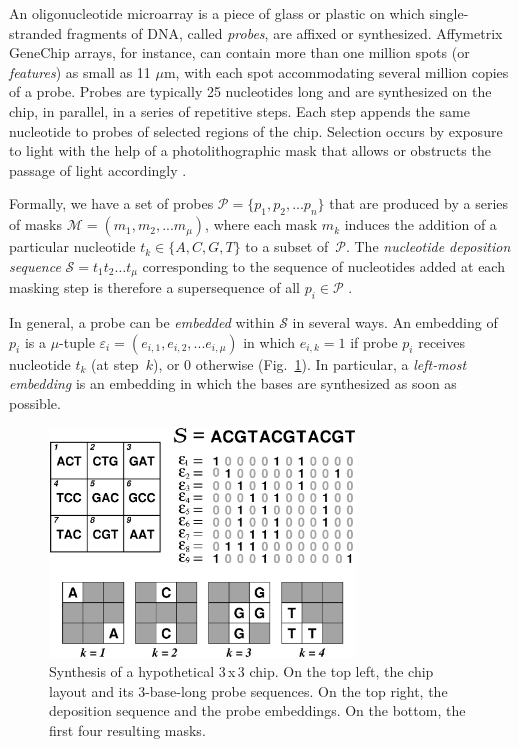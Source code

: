 \documentclass[runningheads]{llncs}
\begin{document}
An oligonucleotide microarray is a piece of glass or plastic on which
single-stranded fragments of DNA, called \emph{probes}, are affixed or
synthesized. Affymetrix GeneChip\raisebox{.6ex}{\scriptsize \textregistered}
arrays, for instance, can contain
more than one million spots (or \emph{features}) as small as 11 $\mu$m,
with each spot accommodating several million copies of a probe. Probes
are typically 25 nucleotides long and are synthesized on the chip, in parallel,
in a series of repetitive steps. Each step appends the same
nucleotide to probes of selected regions of the chip. Selection occurs
by exposure to light with the help of a photolithographic mask that
allows or obstructs the passage of light accordingly \cite{FODOR91}.

Formally, we have a set of probes $\mathcal{P} = \{p_{1}, p_{2}, ... p_{n}\}$
that are produced by a series of masks $\mathcal{M} = (m_{1}, m_{2}, ... m_{\mu})$,
where each mask $m_{k}$ induces the addition of a particular nucleotide
$t_{k} \in \{A, C, G, T\}$ to a subset of~$\mathcal{P}$. The \emph{nucleotide
deposition sequence} $\mathcal{S} = t_{1} t_{2} \ldots t_{\mu}$ corresponding
to the sequence of nucleotides added at each masking step is therefore a
supersequence of all $p_{i} \in \mathcal{P}$ \cite{RAHMANN03}.

In general, a probe can be \emph{embedded} within $\mathcal{S}$ in several
ways. An embedding of $p_{i}$ is a $\mu$-tuple
$\varepsilon_{i} = (e_{i,1}, e_{i,2}, ... e_{i,\mu})$ in which $e_{i,k} = 1$
if probe $p_{i}$ receives nucleotide $t_{k}$ (at step~$k$), or 0 otherwise
(Fig.~\ref{fig:masking_process}). In particular, a \emph{left-most embedding}
is an embedding in which the bases are synthesized as soon as possible.

\begin{figure}
\centerline{\includegraphics[width=230pt]{chip}}
\caption{Synthesis of a hypothetical 3\,x\,3 chip. On the top left, the chip
layout and its 3-base-long probe sequences. On the top right, the deposition
sequence and the probe embeddings. On the bottom, the first four resulting masks.}
\label{fig:masking_process}
\end{figure}
\end{document}
